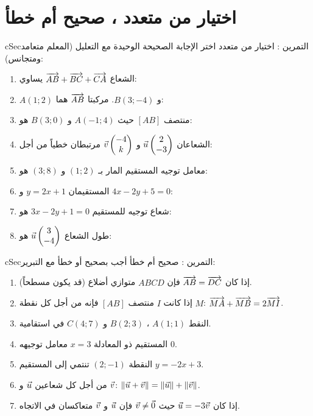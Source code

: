\documentclass[12pt,a4paper]{article}
\newenvironment{BOX}[2]{\begin{otherlanguage}{english}\begin{arbox}{#1}{#2}}{\end{arbox}\end{otherlanguage}}
\newcounter{exo}
\newenvironment{tamrin}[1]{\stepcounter{exo}\begin{BOX}{cSec}{التمرين \theexo: #1}}{\end{BOX}}
\begin{document}
\section{اختيار من متعدد ، صحيح أم خطأ}
\begin{tamrin}{اختيار من متعدد}
اختر الإجابة الصحيحة الوحيدة مع التعليل (المعلم متعامد ومتجانس):
\begin{enumerate}
\item الشعاع $\overrightarrow{AB}+\overrightarrow{BC}+\overrightarrow{CA}$ يساوي:
\item $A(1;2)$ و $B(3;-4)$. مركبتا $\overrightarrow{AB}$ هما:
\item منتصف $[AB]$ حيث $A(-1;4)$ و $B(3;0)$ هو:
\item الشعاعان $\vec u\begin{pmatrix}2\\-3\end{pmatrix}$ و $\vec v\begin{pmatrix}-4\\k\end{pmatrix}$ مرتبطان خطياً من أجل:
\item معامل توجيه المستقيم المار بـ $(1;2)$ و $(3;8)$ هو:
\item المستقيمان $y=2x+1$ و $4x-2y+5=0$:
\item شعاع توجيه للمستقيم $3x-2y+1=0$ هو:
\item طول الشعاع $\vec u\begin{pmatrix}3\\-4\end{pmatrix}$ هو:
\end{enumerate}
\end{tamrin}

\begin{tamrin}{صحيح أم خطأ}
أجب بصحيح أو خطأ مع التبرير:
\begin{enumerate}
\item إذا كان $\overrightarrow{AB}=\overrightarrow{DC}$ فإن $ABCD$ متوازي أضلاع (قد يكون مسطحاً).
\item إذا كانت $I$ منتصف $[AB]$ فإنه من أجل كل نقطة $M$: $\overrightarrow{MA}+\overrightarrow{MB}=2\overrightarrow{MI}$.
\item النقط $A(1;1)$ ، $B(2;3)$ و $C(4;7)$ في استقامية.
\item المستقيم ذو المعادلة $x=3$ معامل توجيهه $0$.
\item النقطة $(2;-1)$ تنتمي إلى المستقيم $y=-2x+3$.
\item من أجل كل شعاعين $\vec u$ و $\vec v$: $\|\vec u+\vec v\|=\|\vec u\|+\|\vec v\|$.
\item إذا كان $\vec u=-3\vec v$ حيث $\vec v\ne\vec0$ فإن $\vec u$ و $\vec v$ متعاكسان في الاتجاه.
\end{enumerate}
\end{tamrin}
\end{document}
